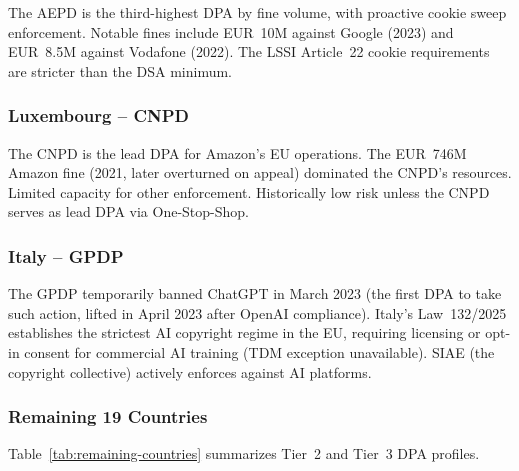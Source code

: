 \documentclass[11pt,a4paper]{article}
\begin{document}
The AEPD is the third-highest DPA by fine volume, with proactive cookie sweep enforcement. Notable fines include EUR~10M against Google (2023) and EUR~8.5M against Vodafone (2022). The LSSI Article~22 cookie requirements are stricter than the DSA minimum.

\subsubsection{Luxembourg -- CNPD}

The CNPD is the lead DPA for Amazon's EU operations. The EUR~746M Amazon fine (2021, later overturned on appeal) dominated the CNPD's resources. Limited capacity for other enforcement. Historically low risk unless the CNPD serves as lead DPA via One-Stop-Shop.

\subsubsection{Italy -- GPDP}

The GPDP temporarily banned ChatGPT in March 2023 (the first DPA to take such action, lifted in April 2023 after OpenAI compliance). Italy's Law~132/2025 establishes the strictest AI copyright regime in the EU, requiring licensing or opt-in consent for commercial AI training (TDM exception unavailable). SIAE (the copyright collective) actively enforces against AI platforms.

\subsubsection{Remaining 19 Countries}

Table~\ref{tab:remaining-countries} summarizes Tier~2 and Tier~3 DPA profiles.
\end{document}
